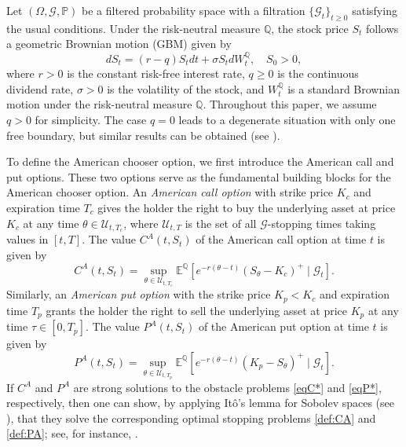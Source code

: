 \documentclass[11pt, a4paper, leqno]{amsart}
\numberwithin{equation}{section}
\theoremstyle{plain}
\theoremstyle{definition}
\theoremstyle{remark}
\def\ge{\geqslant}
\def\geq{\geqslant}
\begin{document}

Let $(\Omega, \mathcal{G}, \mathbb{P})$ be a filtered probability space with a filtration $\{\mathcal{G}_t\}_{t \geq 0}$ satisfying the usual conditions. Under the risk-neutral measure $\mathbb{Q}$, the stock price $S_t$ follows a geometric Brownian motion (GBM) given by
\begin{equation*}
    dS_t = (r - q) S_t dt + \sigma S_t dW_t^{\mathbb{Q}}, \quad S_0 > 0,
\end{equation*}
where $r>0$ is the constant risk-free interest rate, $q \ge 0$ is the continuous dividend rate, $\sigma > 0$ is the volatility of the stock, and $W_t^{\mathbb{Q}}$ is a standard Brownian motion under the risk-neutral measure $\mathbb{Q}$.
 Throughout this paper, we assume $q > 0$ for simplicity. The case $q = 0$ leads to a degenerate situation with only one free boundary, but similar results can be obtained (see \cite{JJ19}).

To define the American chooser option, we first introduce the American call and put options. These two options serve as the fundamental building blocks for the American chooser option.
An \textit{American call option} with strike price $K_c$ and expiration time $T_c$ gives the holder the right to buy the underlying asset at price $K_c$ at any time $\theta \in \mathcal{U}_{t,T_c}$, where $\mathcal{U}_{t,T}$ is the set of all $\mathcal{G}$-stopping times taking values in $[t,T]$. The value $C^A(t,S_t)$ of the American call option at time $t$ is given by
\begin{equation}\label{def:CA}
    C^A(t, S_t) = \sup_{\theta \in \mathcal{U}_{t,T_c}} \mathbb{E}^{\mathbb{Q}} \left[ e^{-r(\theta - t)} (S_\theta - K_c)^+ \mid \mathcal{G}_t \right].
\end{equation}
Similarly, an \textit{American put option} with the strike price $K_p<K_c$ and expiration time $T_p$ grants the holder the right to sell the underlying asset at price $K_p$ at any time $\tau \in [0,T_p]$. The value $P^A(t,S_t)$ of the American put option at time $t$ is given by
\begin{equation}\label{def:PA}
    P^A(t, S_t) = \sup_{\theta \in \mathcal{U}_{t,T_p}} \mathbb{E}^{\mathbb{Q}} \left[ e^{-r(\theta - t)} (K_p - S_\theta)^+ \mid \mathcal{G}_t \right].
\end{equation}
If \( C^A \) and \( P^A \) are strong solutions to the obstacle problems \eqref{eqC*} and \eqref{eqP*}, respectively, then one can show, by applying It\^o's lemma for Sobolev spaces (see \cite{KRY80}), that they solve the corresponding optimal stopping problems \eqref{def:CA} and \eqref{def:PA}; see, for instance, \cite[Appendix B]{CYW11}.
 
\end{document}
